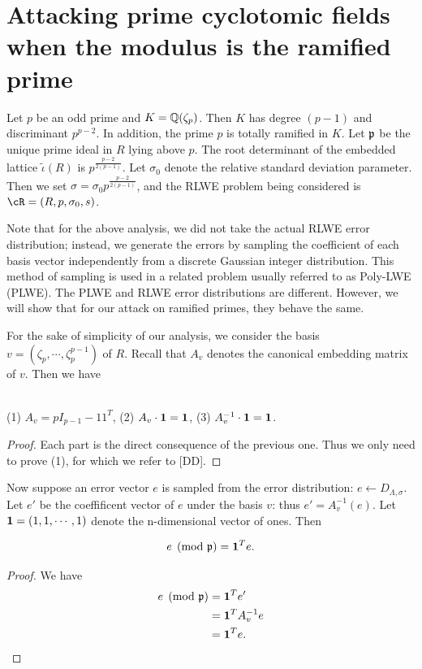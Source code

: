 \documentclass{amsart}
\begin{document}
\section{Attacking prime cyclotomic fields when the modulus is the ramified prime}
\label{sec: ramified-prime}

Let $p$ be an odd prime and $K = \mathbb{Q}(\zeta_p)$. Then $K$ has degree $(p-1)$ and discriminant $p^{p-2}$.
In addition, the prime $p$ is totally ramified in $K$. Let $\mathfrak{p}$ be the unique prime ideal  in $R$ lying above $p$. The root determinant of the embedded lattice $\tilde{\iota}(R)$ is $p^{\frac{p-2}{2(p-1)}}$. Let $\sigma_0$ denote the relative standard deviation parameter. Then we set $\sigma  = \sigma_0 p^{\frac{p-2}{2(p-1)}}$, and the RLWE problem being considered is $\cR = (R, p, \sigma_0, s)$.

Note that for the above analysis, we did not take the actual RLWE error distribution; instead, we generate the errors by sampling the coefficient of each basis vector independently
from a discrete Gaussian integer distribution. This method of sampling is used in a related problem usually referred to as Poly-LWE (PLWE). The PLWE and RLWE error distributions are different. However, we will show that for our attack on ramified primes, they behave the same.


For the sake of simplicity of our analysis, we consider the basis  $v = (\zeta_p, \cdots, \zeta_{p}^{p-1})$ of $R$. Recall that $A_v$ denotes the canonical embedding matrix of $v$. Then we have

\begin{Lemma} \qquad \\
(1) $A_v = pI_{p-1} - 11^T$,
(2) $A_v \cdot {\bf 1} = {\bf 1}$,
(3) $A_v^{-1} \cdot {\bf 1} = {\bf 1}$.
\end{Lemma}

\begin{proof}
Each part is the direct consequence of the previous one. Thus we only need to prove (1), for which we refer to [DD].
\end{proof}

Now suppose an error vector $e$ is sampled from the error distribution: $e \gets D_{\Lambda, \sigma}$.  Let $e'$ be the coeffificent vector of $e$ under the basis $v$: thus $e' = A_v^{-1}(e)$. Let ${\bf 1} = (1,1, \cdots,1)$ denote the n-dimensional vector of ones. Then

\begin{Lemma}
\[
e\pmod{\mathfrak{p}} = {\bf 1}^T e.
\]
\end{Lemma}
\begin{proof}
We have
\begin{align*}
e\pmod{\mathfrak{p}}  &= {\bf 1}^T e' \\
&= {\bf 1}^T A_v^{-1} e \\
& = {\bf 1}^T e.
\end{align*}
\end{proof}
\end{document}
